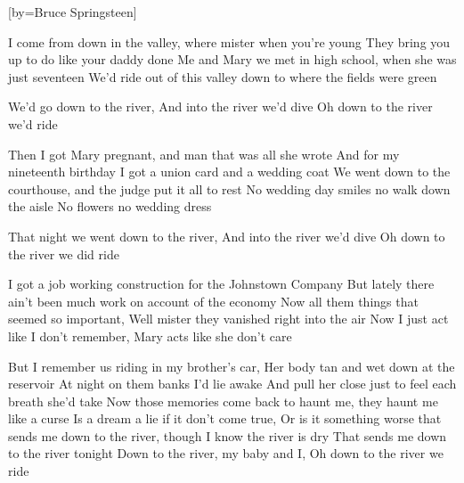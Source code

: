  

[by=Bruce Springsteen]




\beginverse
I come from down in the valley, \brk  where mister when you're young
They bring you up to do like your daddy done
Me and Mary we met in high school, \brk  when she was just seventeen
We'd ride out of this valley down to where the fields were green
\endverse

\beginverse
We'd go down to the river, \brk  And into the river we'd dive
Oh down to the river we'd ride
\endverse

\beginverse
Then I got Mary pregnant, \brk  and man that was all she wrote
And for my nineteenth birthday I got a union card and a wedding coat
We went down to the courthouse, \brk  and the judge put it all to rest
No wedding day smiles no walk down the aisle
No flowers no wedding dress
\endverse

\beginverse
That night we went down to the river, \brk  And into the river we'd dive
Oh down to the river we did ride
\endverse

\beginverse
I got a job working construction for the Johnstown Company
But lately there ain't been much work on account of the economy
Now all them things that seemed so important, \brk  Well mister they vanished right into the air
Now I just act like I don't remember, \brk  Mary acts like she don't care
\endverse

\beginverse
But I remember us riding in my brother's car, \brk  Her body tan and wet down at the reservoir
At night on them banks I'd lie awake
And pull her close just to feel each breath she'd take
Now those memories come back to haunt me, \brk  they haunt me like a curse
Is a dream a lie if it don't come true, \brk  Or is it something worse
that sends me down to the river, \brk  though I know the river is dry
That sends me down to the river tonight
Down to the river, \brk  my baby and I, \brk  Oh down to the river we ride 
\endverse




\endsong
